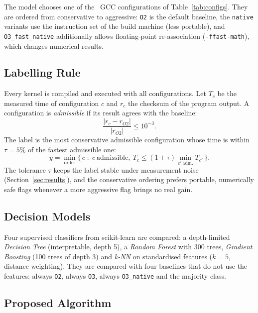 \documentclass[12pt,a4paper]{article}
\begin{document}
The model chooses one of the \numConfigs\ GCC configurations of Table~\ref{tab:configs}.
They are ordered from conservative to aggressive: \texttt{O2} is the default baseline,
the \texttt{native} variants use the instruction set of the build machine (less portable),
and \texttt{O3\_fast\_native} additionally allows floating-point re-association
(\texttt{-ffast-math}), which changes numerical results.



\subsection{Labelling Rule}

Every kernel is compiled and executed with all configurations. Let $T_c$ be the
measured time of configuration $c$ and $r_c$ the checksum of the program output. A
configuration is \emph{admissible} if its result agrees with the baseline:
\begin{equation}
\frac{|r_c-r_{O2}|}{|r_{O2}|} \le 10^{-3}.
\end{equation}
The label is the most conservative admissible configuration whose time is within
$\tau=5\%$ of the fastest admissible one:
\begin{equation}
y = \min_{\text{order}}\{\,c \;:\; c\ \text{admissible},\ T_c \le (1+\tau)\min_{c'\ \text{adm.}} T_{c'}\,\}.
\end{equation}
The tolerance $\tau$ keeps the label stable under measurement noise
(Section~\ref{sec:results}), and the conservative ordering prefers portable, numerically safe
flags whenever a more aggressive flag brings no real gain.

\subsection{Decision Models}

Four supervised classifiers from scikit-learn \cite{pedregosa2011} are compared: a depth-limited
\emph{Decision Tree} (interpretable, depth 5), a \emph{Random Forest} \cite{breiman2001} with
300 trees, \emph{Gradient Boosting} (100 trees of depth 3) and \emph{k-NN} on standardised features
($k=5$, distance weighting). They are compared with four baselines that do not use the features:
always \texttt{O2}, always \texttt{O3}, always \texttt{O3\_native} and the majority class.

\subsection{Proposed Algorithm}
\end{document}
